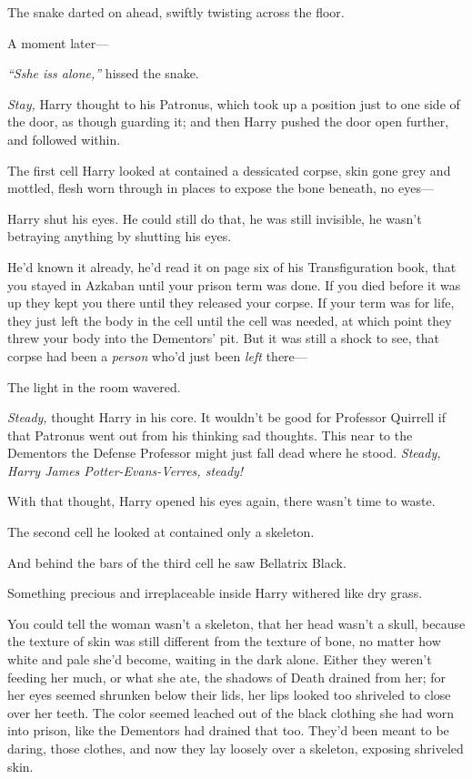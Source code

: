 The snake darted on ahead, swiftly twisting across the floor.

A moment later---

\emph{``Sshe iss alone,''} hissed the snake.

\emph{Stay,} Harry thought to his Patronus, which took up a position
just to one side of the door, as though guarding it; and then Harry
pushed the door open further, and followed within.

The first cell Harry looked at contained a dessicated corpse, skin gone
grey and mottled, flesh worn through in places to expose the bone
beneath, no eyes---

Harry shut his eyes. He could still do that, he was still invisible, he
wasn't betraying anything by shutting his eyes.

He'd known it already, he'd read it on page six of his Transfiguration
book, that you stayed in Azkaban until your prison term was done. If you
died before it was up they kept you there until they released your
corpse. If your term was for life, they just left the body in the cell
until the cell was needed, at which point they threw your body into the
Dementors' pit. But it was still a shock to see, that corpse had been a
\emph{person} who'd just been \emph{left} there---

The light in the room wavered.

\emph{Steady,} thought Harry in his core. It wouldn't be good for
Professor Quirrell if that Patronus went out from his thinking sad
thoughts. This near to the Dementors the Defense Professor might just
fall dead where he stood. \emph{Steady, Harry James Potter-Evans-Verres,
steady!}

With that thought, Harry opened his eyes again, there wasn't time to
waste.

The second cell he looked at contained only a skeleton.

And behind the bars of the third cell he saw Bellatrix Black.

Something precious and irreplaceable inside Harry withered like dry
grass.

You could tell the woman wasn't a skeleton, that her head wasn't a
skull, because the texture of skin was still different from the texture
of bone, no matter how white and pale she'd become, waiting in the dark
alone. Either they weren't feeding her much, or what she ate, the
shadows of Death drained from her; for her eyes seemed shrunken below
their lids, her lips looked too shriveled to close over her teeth. The
color seemed leached out of the black clothing she had worn into prison,
like the Dementors had drained that too. They'd been meant to be daring,
those clothes, and now they lay loosely over a skeleton, exposing
shriveled skin.

